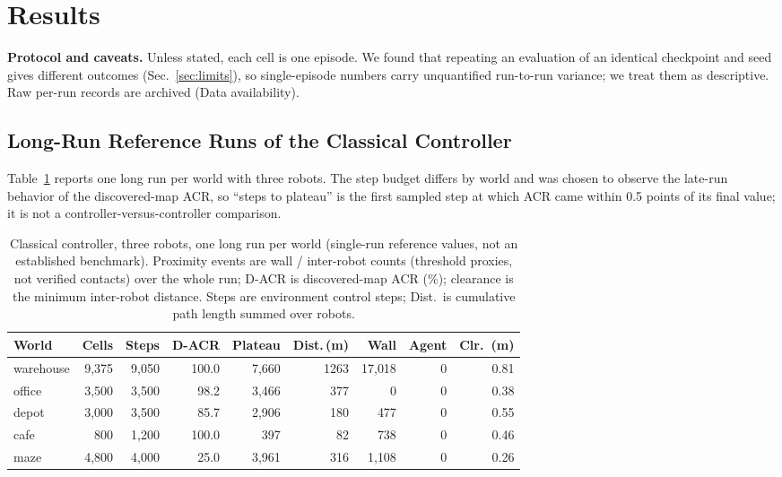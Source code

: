 \documentclass[conference]{IEEEtran}
\begin{document}
\section{Results}
\label{sec:results}
\textbf{Protocol and caveats.} Unless stated, each cell is one episode. We
found that repeating an evaluation of an identical checkpoint and seed gives
different outcomes (Sec.~\ref{sec:limits}), so single-episode numbers carry
unquantified run-to-run variance; we treat them as descriptive. Raw per-run
records are archived (Data availability).

\subsection{Long-Run Reference Runs of the Classical Controller}
Table~\ref{tab:ceil} reports one long run per world with three robots. The
step budget differs by world and was chosen to observe the late-run behavior of the discovered-map ACR,
so ``steps to plateau'' is the first sampled step at which ACR came within
0.5 points of its final value; it is not a controller-versus-controller
comparison.

\begin{table}[t]
\centering
\caption{Classical controller, three robots, one long run per world (single-run reference values, not an established benchmark). Proximity events are wall / inter-robot counts (threshold proxies, not verified contacts) over the whole run; D-ACR is discovered-map ACR (\%); clearance is the minimum inter-robot distance. Steps are environment control steps; Dist.\ is cumulative path length summed over robots.}
\label{tab:ceil}
\footnotesize
\setlength{\tabcolsep}{2.2pt}
\begin{tabular}{@{}lrrrrrrrr@{}}
\toprule
World & Cells & Steps & D-ACR & Plateau & Dist.\,(m) & Wall & Agent & Clr.\ (m) \\
\midrule
warehouse & 9{,}375 & 9{,}050 & 100.0 & 7{,}660 & 1263 & 17{,}018 & 0 & 0.81 \\
office & 3{,}500 & 3{,}500 & 98.2 & 3{,}466 & 377 & 0 & 0 & 0.38 \\
depot & 3{,}000 & 3{,}500 & 85.7 & 2{,}906 & 180 & 477 & 0 & 0.55 \\
cafe & 800 & 1{,}200 & 100.0 & 397 & 82 & 738 & 0 & 0.46 \\
maze & 4{,}800 & 4{,}000 & 25.0 & 3{,}961 & 316 & 1{,}108 & 0 & 0.26 \\
\bottomrule
\end{tabular}
\end{table}
\end{document}
